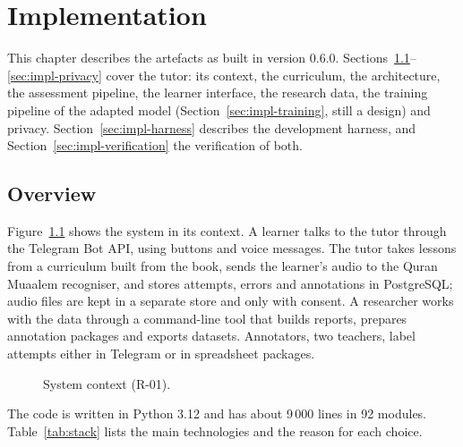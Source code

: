\chapter{Implementation}\label{ch:impl}

This chapter describes the artefacts as built in version 0.6.0. Sections~\ref{sec:impl-overview}--%
\ref{sec:impl-privacy} cover the tutor: its context, the curriculum, the architecture, the assessment
pipeline, the learner interface, the research data, the training pipeline of the adapted model (Section~\ref{sec:impl-training}, still a design) and privacy. Section~\ref{sec:impl-harness} describes
the development harness, and Section~\ref{sec:impl-verification} the verification of both.

\section{Overview}\label{sec:impl-overview}

Figure~\ref{fig:context} shows the system in its context. A learner talks to the tutor through the Telegram
Bot API, using buttons and voice messages. The tutor takes lessons from a curriculum built from the book,
sends the learner's audio to the Quran Muaalem recogniser, and stores attempts, errors and annotations in
PostgreSQL; audio files are kept in a separate store and only with consent. A researcher works with the data
through a command-line tool that builds reports, prepares annotation packages and exports datasets.
Annotators, two teachers, label attempts either in Telegram or in spreadsheet packages.

\begin{figure}[ht]
\centering
\resizebox{0.95\linewidth}{!}{}
\caption{System context (R-01).}\label{fig:context}
\end{figure}

The code is written in Python 3.12 and has about 9\,000 lines in 92 modules. Table~\ref{tab:stack} lists
the main technologies and the reason for each choice.

